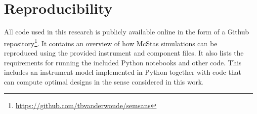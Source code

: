 \section{Reproducibility}
\label{c7.2}
All code used in this research is publicly available online in the form of a Github repository\footnote{\url{https://github.com/tbvanderwoude/semsans}}. It contains an overview of how McStas simulations can be reproduced using the provided instrument and component files. It also lists the requirements for running the included Python notebooks and other code. This includes an instrument model implemented in Python together with code that can compute optimal designs in the sense considered in this work.